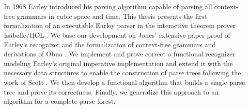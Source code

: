 \documentclass[headsepline,footsepline,footinclude=false,oneside,fontsize=11pt,paper=a4,listof=totoc,bibliography=totoc]{scrbook} %
\begin{document}
\chapter{\abstractname}

In 1968 Earley \cite{Earley:1970} introduced his parsing algorithm capable of parsing all context-free grammars in cubic
space and time. This thesis presents the first formalization of an executable Earley parser in the interactive
theorem prover Isabelle/HOL \cite{Nipkow:2002}. We base our development on Jones' \cite{Jones:1972}
extensive paper proof of Earley's recognizer and the formalization of context-free grammars
and derivations of Obua \cite{Obua:2017}. We implement and prove correct a functional recognizer modeling Earley's
original imperative implementation and extend it with the necessary data structures to enable the construction
of parse trees following the work of Scott \cite{Scott:2008}. We then develop a functional algorithm that
builds a single parse tree and prove its correctness. Finally, we generalize this approach to an algorithm
for a complete parse forest.

\tableofcontents{}

\mainmatter{}




\printbibliography{}
\end{document}
